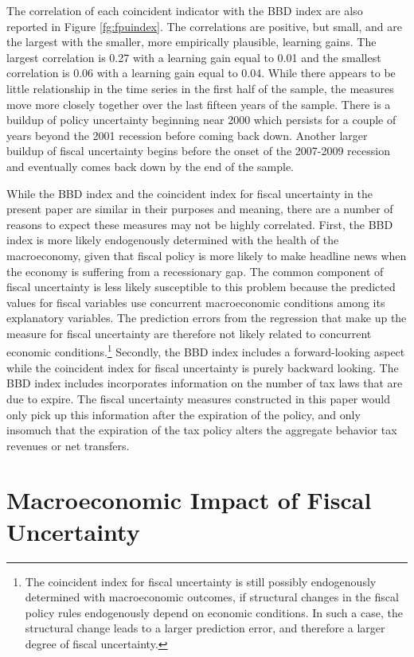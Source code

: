 \documentclass[11pt]{article}
\begin{document}
The correlation of each coincident indicator with the BBD index are also reported in Figure \ref{fg:fpuindex}.  The correlations are positive, but small, and are the largest with the smaller, more empirically plausible, learning gains.  The largest correlation is 0.27 with a learning gain equal to 0.01 and the smallest correlation is 0.06 with a learning gain equal to 0.04.  While there appears to be little relationship in the time series in the first half of the sample, the measures move more closely together over the last fifteen years of the sample.  There is a buildup of policy uncertainty beginning near 2000 which persists for a couple of years beyond the 2001 recession before coming back down.  Another larger buildup of fiscal uncertainty begins before the onset of the 2007-2009 recession and eventually comes back down by the end of the sample.  

While the BBD index and the coincident index for fiscal uncertainty in the present paper are similar in their purposes and meaning, there are a number of reasons to expect these measures may not be highly correlated.  First, the BBD index is more likely endogenously determined with the health of the macroeconomy, given that fiscal policy is more likely to make headline news when the economy is suffering from a recessionary gap.  The common component of fiscal uncertainty is less likely susceptible to this problem because the predicted values for fiscal variables use concurrent macroeconomic conditions among its explanatory variables.  The prediction errors from the regression that make up the measure for fiscal uncertainty are therefore not likely related to concurrent economic conditions.\footnote{The coincident index for fiscal uncertainty is still possibly endogenously determined with macroeconomic outcomes, if structural changes in the fiscal policy rules endogenously depend on economic conditions.  In such a case, the structural change leads to a larger prediction error, and therefore a larger degree of fiscal uncertainty.} Secondly, the BBD index includes a forward-looking aspect while the coincident index for fiscal uncertainty is purely backward looking.  The BBD index includes incorporates information on the number of tax laws that are due to expire.  The fiscal uncertainty measures constructed in this paper would only pick up this information after the expiration of the policy, and only insomuch that the expiration of the tax policy alters the aggregate behavior tax revenues or net transfers. 

\section{Macroeconomic Impact of Fiscal Uncertainty}
\end{document}
